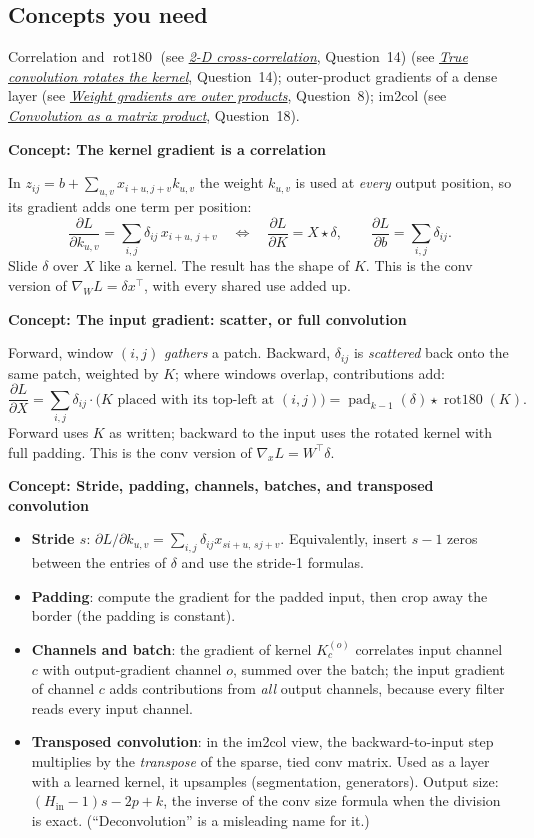 \documentclass[12pt,a4paper]{article}
\newcommand{\concept}[2]{\par\medskip\phantomsection\label{#1}{\large\bfseries\color{blue!50!black} Concept: #2}\par}
\newcommand{\seeconcept}[3]{(see \hyperref[#1]{\textit{#2}}, Question~#3)}
\newcommand{\rot}{\operatorname{rot180}}
\begin{document}
\subsection*{Concepts you need}
Correlation and $\rot$ \seeconcept{c:corr2d}{2-D cross-correlation}{14} \seeconcept{c:rot180}{True convolution rotates the kernel}{14}; outer-product gradients of a dense layer \seeconcept{c:outer}{Weight gradients are outer products}{8}; im2col \seeconcept{c:im2col}{Convolution as a matrix product}{18}.

\concept{c:convgradK}{The kernel gradient is a correlation}
In $z_{ij}=b+\sum_{u,v}x_{i+u,j+v}k_{u,v}$ the weight $k_{u,v}$ is used at \emph{every} output position, so its gradient adds one term per position:
\[
\frac{\partial L}{\partial k_{u,v}}=\sum_{i,j}\delta_{ij}\,x_{i+u,\,j+v}\quad\Longleftrightarrow\quad \frac{\partial L}{\partial K}=X\star\delta,\qquad \frac{\partial L}{\partial b}=\sum_{i,j}\delta_{ij}.
\]
Slide $\delta$ over $X$ like a kernel. The result has the shape of $K$. This is the conv version of $\nabla_WL=\delta x^\top$, with every shared use added up.

\concept{c:convgradX}{The input gradient: scatter, or full convolution}
Forward, window $(i,j)$ \emph{gathers} a patch. Backward, $\delta_{ij}$ is \emph{scattered} back onto the same patch, weighted by $K$; where windows overlap, contributions add:
\[
\frac{\partial L}{\partial X}=\sum_{i,j}\delta_{ij}\cdot\bigl(K\text{ placed with its top-left at }(i,j)\bigr)=\operatorname{pad}_{k-1}(\delta)\star\rot(K).
\]
Forward uses $K$ as written; backward to the input uses the rotated kernel with full padding. This is the conv version of $\nabla_xL=W^\top\delta$.

\concept{c:convgradmore}{Stride, padding, channels, batches, and transposed convolution}
\begin{itemize}[nosep]
\item \textbf{Stride $s$}: $\partial L/\partial k_{u,v}=\sum_{i,j}\delta_{ij}x_{si+u,\,sj+v}$. Equivalently, insert $s-1$ zeros between the entries of $\delta$ and use the stride-1 formulas.
\item \textbf{Padding}: compute the gradient for the padded input, then crop away the border (the padding is constant).
\item \textbf{Channels and batch}: the gradient of kernel $K^{(o)}_c$ correlates input channel $c$ with output-gradient channel $o$, summed over the batch; the input gradient of channel $c$ adds contributions from \emph{all} output channels, because every filter reads every input channel.
\item \textbf{Transposed convolution}: in the im2col view, the backward-to-input step multiplies by the \emph{transpose} of the sparse, tied conv matrix. Used as a layer with a learned kernel, it upsamples (segmentation, generators). Output size: $(H_{\text{in}}-1)s-2p+k$, the inverse of the conv size formula when the division is exact. (``Deconvolution'' is a misleading name for it.)
\end{itemize}
\end{document}
